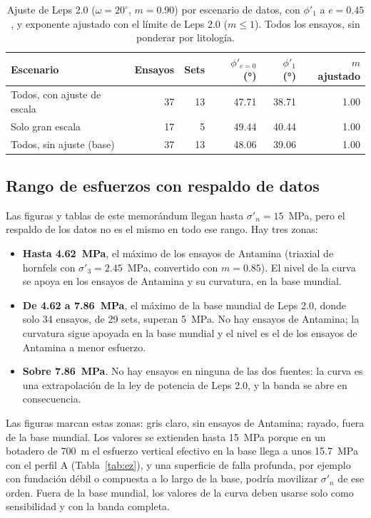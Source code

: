 \documentclass[11pt,letterpaper]{article}
\begin{document}
\begin{table}[!htbp]\centering\small\caption{Ajuste de Leps 2.0 ($\omega = 20^{\circ}$, $m = 0.90$) por escenario de datos, con $\phi'_1$ a $e = 0.45$, y exponente ajustado con el límite de Leps 2.0 ($m \le 1$). Todos los ensayos, sin ponderar por litología.}\label{tab:esc}
\begin{tabular}{lrrrrr}\toprule Escenario & Ensayos & Sets & $\phi'_{e=0}$ (°) & $\phi'_1$ (°) & $m$ ajustado\\\midrule
Todos, con ajuste de escala & 37 & 13 & 47.71 & 38.71 & 1.00 \\
Solo gran escala & 17 & 5 & 49.44 & 40.44 & 1.00 \\
Todos, sin ajuste (base) & 37 & 13 & 48.06 & 39.06 & 1.00 \\
\bottomrule\end{tabular}\end{table}

\subsection{Rango de esfuerzos con respaldo de datos}\label{sec:rango}
Las figuras y tablas de este memorándum llegan hasta $\sigma'_n = 15$~MPa, pero el respaldo de los datos no es el mismo en todo ese rango. Hay tres zonas:
\begin{itemize}
\item \textbf{Hasta 4.62~MPa}, el máximo de los ensayos de Antamina (triaxial de hornfels con $\sigma'_3 = 2.45$~MPa, convertido con $m = 0.85$). El nivel de la curva se apoya en los ensayos de Antamina y su curvatura, en la base mundial.
\item \textbf{De 4.62 a 7.86~MPa}, el máximo de la base mundial de Leps 2.0, donde solo 34 ensayos, de 29 sets, superan 5~MPa. No hay ensayos de Antamina; la curvatura sigue apoyada en la base mundial y el nivel es el de los ensayos de Antamina a menor esfuerzo.
\item \textbf{Sobre 7.86~MPa}. No hay ensayos en ninguna de las dos fuentes: la curva es una extrapolación de la ley de potencia de Leps 2.0, y la banda se abre en consecuencia.
\end{itemize}
Las figuras marcan estas zonas: gris claro, sin ensayos de Antamina; rayado, fuera de la base mundial. Los valores se extienden hasta 15~MPa porque en un botadero de 700~m el esfuerzo vertical efectivo en la base llega a unos 15.7~MPa con el perfil A (Tabla~\ref{tab:ez}), y una superficie de falla profunda, por ejemplo con fundación débil o compuesta a lo largo de la base, podría movilizar $\sigma'_n$ de ese orden. Fuera de la base mundial, los valores de la curva deben usarse solo como sensibilidad y con la banda completa.
\end{document}
